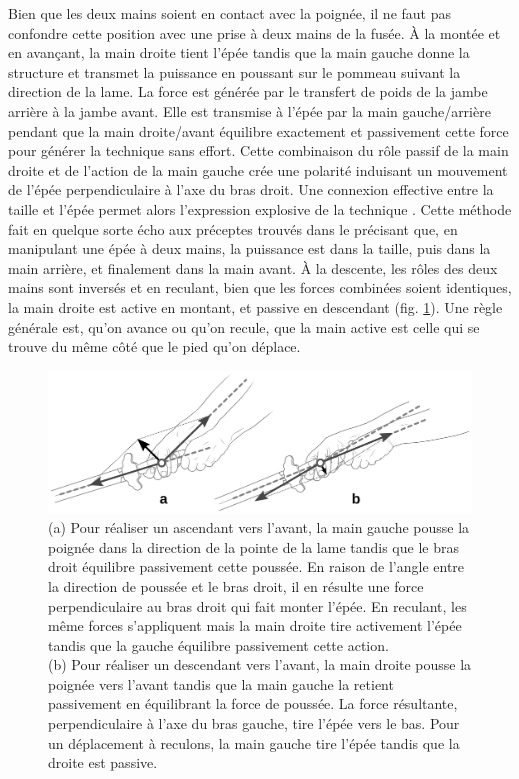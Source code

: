 Bien que les deux mains soient en contact avec la poignée, il ne faut pas confondre cette position avec une prise à deux mains de la fusée. À la montée et en avançant, la main droite tient l'épée tandis que la main gauche donne la structure et transmet la puissance en poussant sur le pommeau suivant la direction de la lame. La force est générée par le transfert de poids de la jambe arrière à la jambe avant. Elle est transmise à l'épée par la main gauche/arrière pendant que la main droite/avant équilibre exactement et passivement cette force pour générer la technique sans effort. Cette combinaison du rôle passif de la main droite et de l'action de la main gauche crée une polarité induisant un mouvement de l'épée perpendiculaire à l'axe du bras droit. Une connexion effective entre la taille et l'épée permet alors l'expression explosive de la technique \Duo{}. Cette méthode fait en quelque sorte écho aux préceptes trouvés dans le \JianJing{} précisant que, en manipulant une épée à deux mains, la puissance est dans la taille, puis dans la main arrière, et finalement dans la main avant. À la descente, les rôles des deux mains sont inversés et en reculant, bien que les forces combinées soient identiques, la main droite est active en montant, et passive en descendant (fig. \ref{fig:duo_detail}). Une règle générale est, qu'on avance ou qu'on recule, que la main active est celle qui se trouve du même côté que le pied qu'on déplace.

\begin{figure}[ht]
	\centering
	
	\includegraphics[width=1.00\textwidth]{../../Images/JibenJianfa/Duo/DuoDetail.pdf}
	\caption[Équilibre des forces dans le \Duo{}]{(a) Pour réaliser un \Duo{} ascendant vers l'avant, la main gauche pousse la poignée dans la direction de la pointe de la lame tandis que le bras droit équilibre passivement cette poussée. En raison de l'angle entre la direction de poussée et le bras droit, il en résulte une force perpendiculaire au bras droit qui fait monter l'épée. En reculant, les même forces s'appliquent mais la main droite tire activement l'épée tandis que la gauche équilibre passivement cette action. \\
	(b) Pour réaliser un \Duo{} descendant vers l'avant, la main droite pousse la poignée vers l'avant tandis que la main gauche la retient passivement en équilibrant la force de poussée. La force résultante, perpendiculaire à l'axe du bras gauche, tire l'épée vers le bas. Pour un déplacement à reculons, la main gauche tire l'épée tandis que la droite est passive.
	}
	\label{fig:duo_detail}
\end{figure} 


